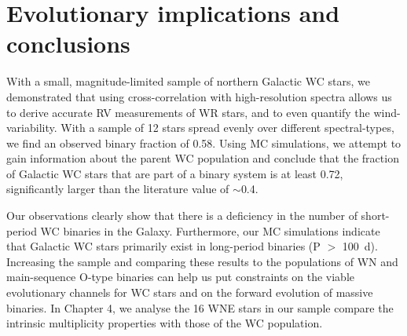\section{Evolutionary implications and conclusions}\label{sect:conclusions}
With a small, magnitude-limited sample of northern Galactic WC stars, we demonstrated that using cross-correlation with high-resolution spectra allows us to derive accurate RV measurements of WR stars, and to even quantify the wind-variability. With a sample of 12 stars spread evenly over different spectral-types, we find an observed binary fraction of 0.58. Using MC simulations, we attempt to gain information about the parent WC population and conclude that the fraction of Galactic WC stars that are part of a binary system is at least 0.72, significantly larger than the literature value of ${\sim}$0.4. 

Our observations clearly show that there is a deficiency in the number of short-period WC binaries in the Galaxy. Furthermore, our MC simulations indicate that Galactic WC stars primarily exist in long-period binaries (P $>$ 100~d). Increasing the sample and comparing these results to the populations of WN and main-sequence O-type binaries can help us put constraints on the viable evolutionary channels for WC stars and on the forward evolution of massive binaries. In Chapter 4, we analyse the 16 WNE stars in our sample compare the intrinsic multiplicity properties with those of the WC population. 



